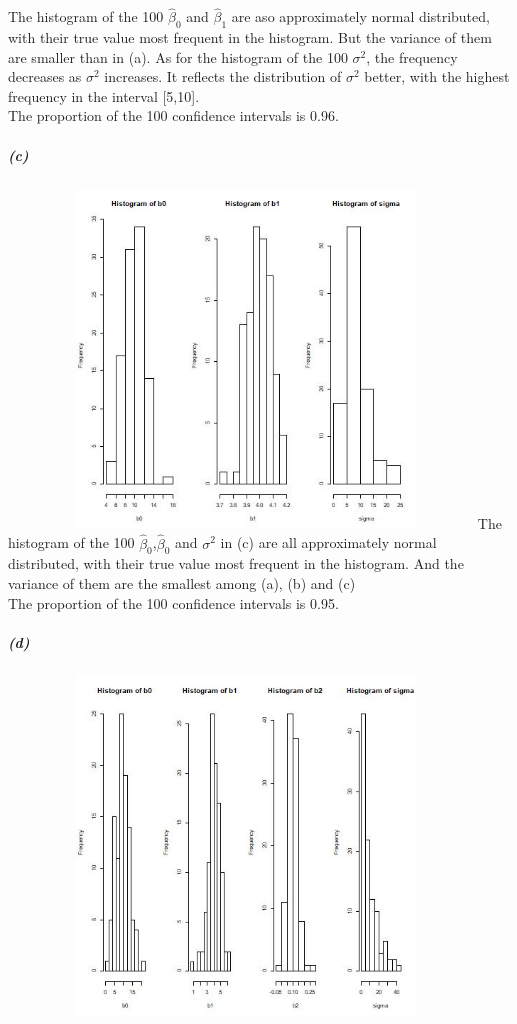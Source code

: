 \documentclass{article}
\begin{document}
\newline
The histogram of the 100  $\hat{\beta}_0$ and $\hat{\beta}_1$ are aso approximately normal distributed, with their true value most frequent in the histogram. But the variance of them are smaller than in (a). As for the histogram of the 100  $\sigma^2$, the frequency decreases as $\sigma^2$ increases. It reflects the distribution of $\sigma^2$ better, with the highest frequency in the interval [5,10].\\
The proportion of the 100 confidence intervals is 0.96.
\subparagraph{(c)}~{}
\newline
\includegraphics[height=9cm,width=12cm]{33.jpg}
\newline
The histogram of the 100 $\hat{\beta}_0$,$\hat{\beta}_0$ and $\sigma^2$ in (c) are all approximately normal distributed, with their true value most frequent in the histogram. And the variance of them are the smallest among (a), (b) and (c)\\
The proportion of the 100 confidence intervals is 0.95.
\subparagraph{(d)}~{}
\newline
\includegraphics[height=9cm,width=12cm]{34.jpg}
\end{document}
